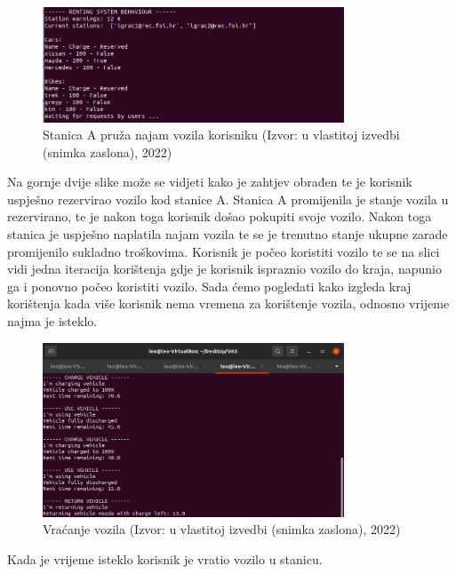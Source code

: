 \documentclass{foi}
\begin{document}
\begin{figure}[H]
	\centering
	\includegraphics[width=0.8\textwidth]{slike/vas8}
	\caption{Stanica A pruža najam vozila korisniku (Izvor: u vlastitoj izvedbi (snimka zaslona), 2022)}
\end{figure}

Na gornje dvije slike može se vidjeti kako je zahtjev obrađen te je korisnik uspješno rezervirao vozilo kod stanice A. Stanica A promijenila je stanje vozila u rezervirano, te je nakon toga korisnik došao pokupiti svoje vozilo. Nakon toga stanica je uspješno naplatila najam vozila te se je trenutno stanje ukupne zarade promijenilo sukladno troškovima. Korisnik je počeo koristiti vozilo te se na slici vidi jedna iteracija korištenja gdje je korisnik ispraznio vozilo do kraja, napunio ga i ponovno počeo koristiti vozilo. Sada ćemo pogledati kako izgleda kraj korištenja kada više korisnik nema vremena za korištenje vozila, odnosno vrijeme najma je isteklo.

\begin{figure}[H]
	\centering
	\includegraphics[width=0.8\textwidth]{slike/vas9}
	\caption{Vraćanje vozila (Izvor: u vlastitoj izvedbi (snimka zaslona), 2022)}
\end{figure}

Kada je vrijeme isteklo korisnik je vratio vozilo u stanicu.

\pagebreak
\end{document}

